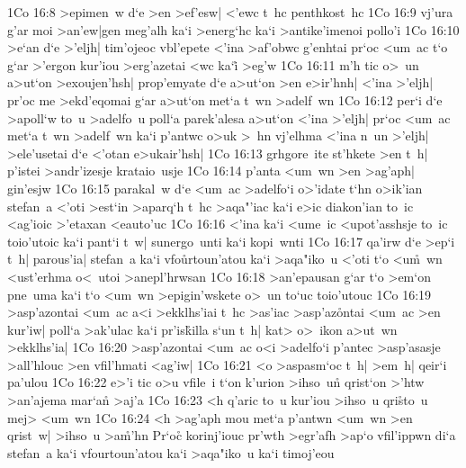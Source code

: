 \vs 1Co 16:8
>epimen~w
d`e
>en
>ef'esw|
<'ewc
t~hc
penthkost~hc\bibvsend
\vs 1Co 16:9
vj'ura
g'ar
moi
>an'ew|gen
meg'alh
ka`i
>energ`hc
ka`i
>antike'imenoi
pollo'i\bibvsend
\vs 1Co 16:10
>e`an
d`e
>'eljh|
tim'ojeoc
vbl'epete
<'ina
>af'obwc
g'enhtai
pr`oc
<um~ac
t`o
g`ar
>'ergon
kur'iou
>erg'azetai
<wc
ka`i\r{}
>eg'w\bibvsend
\vs 1Co 16:11
m'h
tic
o>~un
a>ut`on
>exoujen'hsh|
prop'emyate
d`e
a>ut`on
>en
e>ir'hnh|
<'ina
>'eljh|
pr'oc
me
>ekd'eqomai
g`ar
a>ut`on
met`a
t~wn
>adelf~wn\bibvsend
\vs 1Co 16:12
per`i
d`e
>apoll`w
to~u
>adelfo~u
poll`a
parek'alesa
a>ut`on
<'ina
>'eljh|
pr`oc
<um~ac
met`a
t~wn
>adelf~wn
ka`i
p'antwc
o>uk
>~hn
vj'elhma
<'ina
n~un
>'eljh|
>ele'usetai
d`e
<'otan
e>ukair'hsh|\bibvsend
\vs 1Co 16:13
grhgore~ite
st'hkete
>en
t~h|
p'istei
>andr'izesje
krataio~usje\bibvsend
\vs 1Co 16:14
p'anta
<um~wn
>en
>ag'aph|
gin'esjw\bibvsend
\vs 1Co 16:15
parakal~w
d`e
<um~ac
>adelfo`i
o>'idate
t`hn
o>ik'ian
stefan~a
<'oti
>est`in
>aparq`h
t~hc
>aqa"'iac
ka`i
e>ic
diakon'ian
to~ic
<ag'ioic
>'etaxan
<eauto'uc\bibvsend
\vs 1Co 16:16
<'ina
ka`i
<ume~ic
<upot'asshsje
to~ic
toio'utoic
ka`i
pant`i
t~w|
sunergo~unti
ka`i
kopi~wnti\bibvsend
\vs 1Co 16:17
qa'irw
d`e
>ep`i
t~h|
parous'ia|
stefan~a
ka`i
vfo\r{u}rtoun'atou
ka`i
>aqa"iko~u
<'oti
t`o
<u\r{m}~wn
<ust'erhma
o<~utoi
>anepl'hrwsan\bibvsend
\vs 1Co 16:18
>an'epausan
g`ar
t`o
>em`on
pne~uma
ka`i
t`o
<um~wn
>epigin'wskete
o>~un
to`uc
toio'utouc\bibvsend
\vs 1Co 16:19
>asp'azontai
<um~ac
a<i
>ekklhs'iai
t~hc
>as'iac
>asp'az\r{o}ntai
<um~ac
>en
kur'iw|
poll`a
>ak'ulac
ka`i
pr'is\r{k}illa
s`un
t~h|
kat>
o>~ikon
a>ut~wn
>ekklhs'ia|\bibvsend
\vs 1Co 16:20
>asp'azontai
<um~ac
o<i
>adelfo`i
p'antec
>asp'asasje
>all'hlouc
>en
vfil'hmati
<ag'iw|\bibvsend
\vs 1Co 16:21
<o
>aspasm`oc
t~h|
>em~h|
qeir`i
pa'ulou\bibvsend
\vs 1Co 16:22
e>'i
tic
o>u
vfile~i
t`on
k'urion
>ihso~un\r{}
qrist`on
>'htw
>an'ajema
mar`an\r{}
>aj'a\bibvsend
\vs 1Co 16:23
<h
q'aric
to~u
kur'iou
>ihso~u
qri\r{s}to~u
mej>
<um~wn\bibvsend
\vs 1Co 16:24
<h
>ag'aph
mou
met`a
p'antwn
<um~wn
>en
qrist~w|
>ihso~u
>a\r{m}'hn\bibvsend
{}
Pr`oc\r{}
korinj'iouc
pr'wth
>egr'afh
>ap`o
vfil'ippwn
di`a
stefan~a
ka`i
vfourtoun'atou
ka`i
>aqa"iko~u
ka`i
timoj'eou\bibvsend

